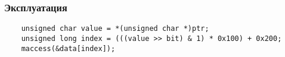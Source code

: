\subsubsection{Эксплуатация}
\begin{frame}[fragile]{\insertsubsubsection}

  \begin{verbatim}
    unsigned char value = *(unsigned char *)ptr;
    unsigned long index = (((value >> bit) & 1) * 0x100) + 0x200;
    maccess(&data[index]);
  \end{verbatim}


\end{frame}

